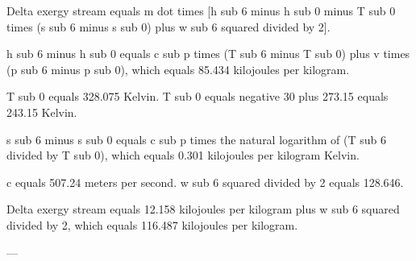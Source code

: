 Delta exergy stream equals m dot times [h sub 6 minus h sub 0 minus T sub 0 times (s sub 6 minus s sub 0) plus w sub 6 squared divided by 2].  

h sub 6 minus h sub 0 equals c sub p times (T sub 6 minus T sub 0) plus v times (p sub 6 minus p sub 0), which equals 85.434 kilojoules per kilogram.  

T sub 0 equals 328.075 Kelvin.  
T sub 0 equals negative 30 plus 273.15 equals 243.15 Kelvin.  

s sub 6 minus s sub 0 equals c sub p times the natural logarithm of (T sub 6 divided by T sub 0), which equals 0.301 kilojoules per kilogram Kelvin.  

c equals 507.24 meters per second.  
w sub 6 squared divided by 2 equals 128.646.  

Delta exergy stream equals 12.158 kilojoules per kilogram plus w sub 6 squared divided by 2, which equals 116.487 kilojoules per kilogram.  

---